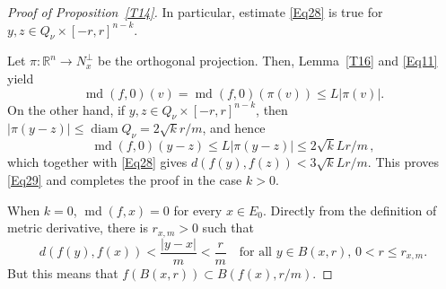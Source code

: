 \documentclass[12pt,leqno]{amsart}
\theoremstyle{definition}
\newtheorem{remark}[theorem]{Remark}
\newcommand{\bbbr}{\mathbb R}
\def\diam{\operatorname{diam}}
\def\md{\operatorname{md}}
\numberwithin{theorem}{section} \numberwithin{equation}{section}
\begin{document}
\begin{proof}[Proof of Proposition~\ref{T14}]
In particular, estimate \eqref{Eq28} is true for $y,z\in Q_\nu\times [-r,r]^{n-k}$.

Let $\pi:\bbbr^n\to N_x^\perp$ be the orthogonal projection. Then, Lemma~\ref{T16} and \eqref{Eq11} yield
$$
\md(f,0)(v)=\md(f,0)(\pi(v))\leq L|\pi(v)|.
$$
On the other hand, if $y,z\in Q_\nu\times [-r,r]^{n-k}$, then $|\pi(y-z)|\leq \diam Q_\nu = 2\sqrt{k}r/m$, and hence
\begin{equation}
\label{eq36}
\md(f,0)(y-z)\leq L|\pi(y-z)|\leq 2\sqrt{k}Lr/m\, ,
\end{equation}
which together with \eqref{Eq28} gives
$d(f(y),f(z))< 3\sqrt{k}Lr/m$. This proves \eqref{Eq29} and completes the proof in the case $k>0$.

When $k=0$, $\md(f,x)=0$ for every $x\in E_0$. Directly from the definition of metric derivative, there is $r_{x,m}>0$ such that
$$
d(f(y),f(x))<\frac{|y-x|}{m}<\frac{r}{m}
\quad
\text{for all $y\in B(x,r), \, 0< r \leq r_{x,m}$.}
$$
But this means that $f(B(x,r))\subset B(f(x),r/m)$.
\end{proof}
\end{document}
